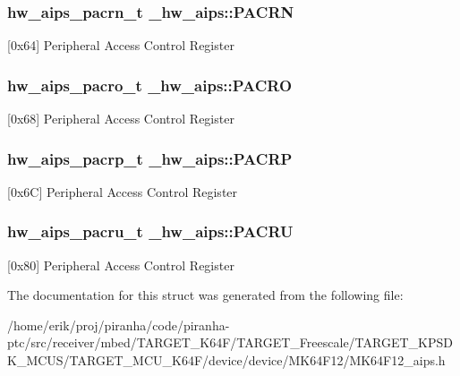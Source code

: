 \subsubsection[{\texorpdfstring{P\+A\+C\+RN}{PACRN}}]{ {\bf hw\+\_\+aips\+\_\+pacrn\+\_\+t} \+\_\+hw\+\_\+aips\+::\+P\+A\+C\+RN}\hypertarget{struct__hw__aips_a78a2d58a08d46d8ca1243228bc1d9167}{}\label{struct__hw__aips_a78a2d58a08d46d8ca1243228bc1d9167}
\mbox{[}0x64\mbox{]} Peripheral Access Control Register 
\subsubsection[{\texorpdfstring{P\+A\+C\+RO}{PACRO}}]{ {\bf hw\+\_\+aips\+\_\+pacro\+\_\+t} \+\_\+hw\+\_\+aips\+::\+P\+A\+C\+RO}\hypertarget{struct__hw__aips_a0d26b9dd4c8d965d38a908720cc30631}{}\label{struct__hw__aips_a0d26b9dd4c8d965d38a908720cc30631}
\mbox{[}0x68\mbox{]} Peripheral Access Control Register 
\subsubsection[{\texorpdfstring{P\+A\+C\+RP}{PACRP}}]{ {\bf hw\+\_\+aips\+\_\+pacrp\+\_\+t} \+\_\+hw\+\_\+aips\+::\+P\+A\+C\+RP}\hypertarget{struct__hw__aips_a04e3d2f12f78b6bad6cc1dbb8c24c704}{}\label{struct__hw__aips_a04e3d2f12f78b6bad6cc1dbb8c24c704}
\mbox{[}0x6C\mbox{]} Peripheral Access Control Register 
\subsubsection[{\texorpdfstring{P\+A\+C\+RU}{PACRU}}]{ {\bf hw\+\_\+aips\+\_\+pacru\+\_\+t} \+\_\+hw\+\_\+aips\+::\+P\+A\+C\+RU}\hypertarget{struct__hw__aips_ac220c75d60f70e9fd86cf43ef7006cec}{}\label{struct__hw__aips_ac220c75d60f70e9fd86cf43ef7006cec}
\mbox{[}0x80\mbox{]} Peripheral Access Control Register 

The documentation for this struct was generated from the following file\+:\begin{DoxyCompactItemize}
\item 
/home/erik/proj/piranha/code/piranha-\/ptc/src/receiver/mbed/\+T\+A\+R\+G\+E\+T\+\_\+\+K64\+F/\+T\+A\+R\+G\+E\+T\+\_\+\+Freescale/\+T\+A\+R\+G\+E\+T\+\_\+\+K\+P\+S\+D\+K\+\_\+\+M\+C\+U\+S/\+T\+A\+R\+G\+E\+T\+\_\+\+M\+C\+U\+\_\+\+K64\+F/device/device/\+M\+K64\+F12/M\+K64\+F12\+\_\+aips.\+h\end{DoxyCompactItemize}
